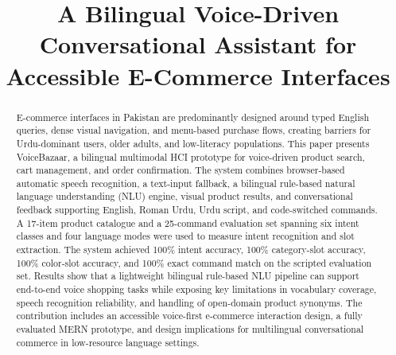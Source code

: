 \documentclass[conference]{IEEEtran}
\begin{document}
\title{A Bilingual Voice-Driven Conversational Assistant for\\Accessible E-Commerce Interfaces}

\author{
}

\maketitle

\begin{abstract}
E-commerce interfaces in Pakistan are predominantly designed around
typed English queries, dense visual navigation, and menu-based purchase
flows, creating barriers for Urdu-dominant users, older adults, and
low-literacy populations. This paper presents VoiceBazaar, a bilingual
multimodal HCI prototype for voice-driven product search, cart
management, and order confirmation. The system combines browser-based
automatic speech recognition, a text-input fallback, a bilingual
rule-based natural language understanding (NLU) engine, visual product
results, and conversational feedback supporting English, Roman Urdu,
Urdu script, and code-switched commands. A 17-item product catalogue
and a 25-command evaluation set spanning six intent classes and four
language modes were used to measure intent recognition and slot
extraction. The system achieved 100\% intent accuracy, 100\%
category-slot accuracy, 100\% color-slot accuracy, and 100\% exact
command match on the scripted evaluation set. Results show that a
lightweight bilingual rule-based NLU pipeline can support end-to-end
voice shopping tasks while exposing key limitations in vocabulary
coverage, speech recognition reliability, and handling of open-domain
product synonyms. The contribution includes an accessible voice-first
e-commerce interaction design, a fully evaluated MERN prototype, and
design implications for multilingual conversational commerce in
low-resource language settings.
\end{abstract}
\end{document}
